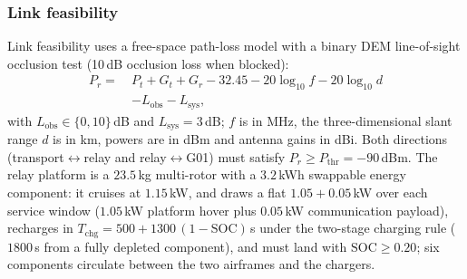 \documentclass[journal]{IEEEtran}
\begin{document}
\subsubsection{Link feasibility}
Link feasibility uses a free-space path-loss model with a binary DEM
line-of-sight occlusion test (10\,dB occlusion loss when blocked):
\begin{equation}
\begin{aligned}
P_r=\ &P_t+G_t+G_r-32.45-20\log_{10}f-20\log_{10}d\\
&-L_{\mathrm{obs}}-L_{\mathrm{sys}},
\end{aligned}
\end{equation}
with $L_{\mathrm{obs}}\in\{0,10\}$\,dB and $L_{\mathrm{sys}}=3$\,dB; $f$ is
in MHz, the three-dimensional slant range $d$ is in km, powers are in dBm
and antenna gains in dBi. Both
directions (transport$\leftrightarrow$relay and relay$\leftrightarrow$G01) must
satisfy $P_r\ge P_{\mathrm{thr}}=-90$\,dBm. The relay platform is a
$23.5$\,kg multi-rotor with a $3.2$\,kWh swappable energy component: it cruises
at $1.15$\,kW, and draws a flat $1.05+0.05$\,kW over each service window
($1.05$\,kW platform hover plus $0.05$\,kW communication payload), recharges in
$T_{\mathrm{chg}}=500+1300\,(1-\mathrm{SOC})$\,s under the two-stage charging
rule ($1800$\,s from a fully depleted component), and must land with
$\mathrm{SOC}\ge0.20$; six components circulate between the two airframes and
the chargers.
\end{document}
